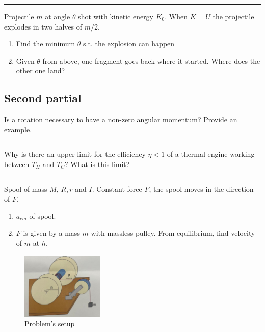 \documentclass[10pt]{extarticle}
\newcommand{\horizonalline}{\noindent\rule{\textwidth}{1pt}}
\begin{document}
\horizonalline

\begin{question}{}{}
    Projectile $m$ at angle $\theta$ shot with kinetic energy $K_0$.
    When $K = U$ the projectile explodes in two halves of $m/2$.

    \begin{enumerate}
        \item Find the minimum $\theta$ s.t. the explosion can happen
        \item Given $\theta$ from above, one fragment goes back where it started. Where does the other one land?
    \end{enumerate}
\end{question}

\subsection{Second partial}

\begin{question}{}{}
    Is a rotation necessary to have a non-zero angular momentum? Provide an example.
\end{question}

\horizonalline

\begin{question}{}{}
    Why is there an upper limit for the efficiency $\eta < 1$ of a thermal engine working between $T_H$ and $T_C$?
    What is this limit?
\end{question}

\horizonalline

\begin{question}{}{}
    Spool of mass $M$, $R, r$ and $I$. Constant force $F$, the spool moves in the direction of $F$.

    \begin{enumerate}
        \item $a_{cm}$ of spool.
        \item $F$ is given by a mass $m$ with massless pulley. From equilibrium, find velocity of $m$ at $h$.
    \end{enumerate}

    \begin{figure}[H]
        \centering
        \includegraphics[width=0.35\textwidth]{assets/S2_P2_PHY1_Exercises/25_may_24-ex2.jpg}
        \caption{Problem's setup}
    \end{figure}
\end{question}
\end{document}
